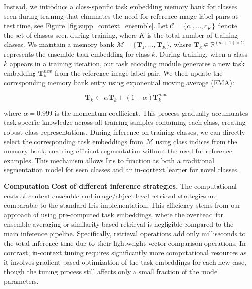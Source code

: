 Instead, we introduce a class-specific task embedding memory bank for classes seen during training that eliminates the need for reference image-label pairs at test time, see Figure~\ref{fig:supp_context_ensemble}. Let $\mathcal{C} = \{c_1, ..., c_K\}$ denote the set of classes seen during training, where $K$ is the total number of training classes. We maintain a memory bank $\mathcal{M} = \{\boldsymbol{T}_1, ..., \boldsymbol{T}_K\}$, where $\boldsymbol{T}_k \in \mathbb{R}^{(m+1) \times C}$ represents the ensemble task embedding for class $k$. During training, when a class $k$ appears in a training iteration, our task encoding module generates a new task embedding $\boldsymbol{T}_k^{new}$ from the reference image-label pair. We then update the corresponding memory bank entry using exponential moving average (EMA):

\begin{equation}
    \boldsymbol{T}_k \leftarrow \alpha\boldsymbol{T}_k + (1-\alpha)\boldsymbol{T}_k^{new}
\end{equation}

where $\alpha=0.999$ is the momentum coefficient. This process gradually accumulates task-specific knowledge across all training samples containing each class, creating robust class representations. During inference on training classes, we can directly select the corresponding task embeddings from $\mathcal{M}$ using class indices from the memory bank, enabling efficient segmentation without the need for reference examples. This mechanism allows Iris to function as both a traditional segmentation model for seen classes and an in-context learner for novel classes.

\textbf{Computation Cost of different inference strategies.} The computational costs of context ensemble and image/object-level retrieval strategies are comparable to the standard Iris implementation. This efficiency stems from our approach of using pre-computed task embeddings, where the overhead for ensemble averaging or similarity-based retrieval is negligible compared to the main inference pipeline. Specifically, retrieval operations add only milliseconds to the total inference time due to their lightweight vector comparison operations. In contrast, in-context tuning requires significantly more computational resources as it involves gradient-based optimization of the task embeddings for each new case, though the tuning process still affects only a small fraction of the model parameters.


